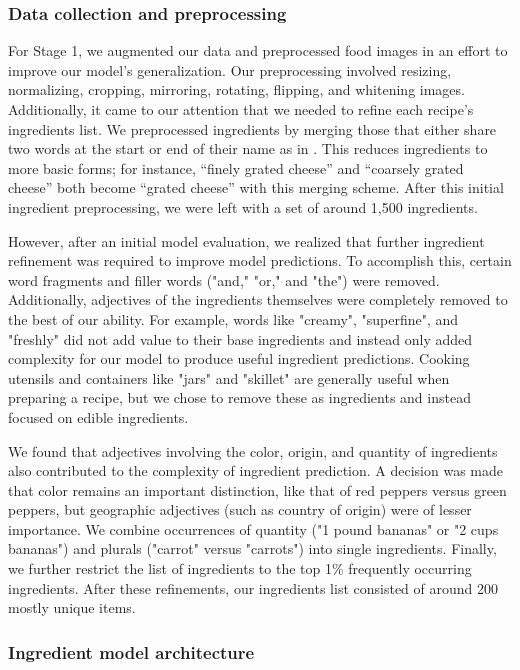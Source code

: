 \documentclass[10pt,twocolumn,letterpaper]{article}
\begin{document}
\subsubsection{Data collection and preprocessing}
For Stage 1, we augmented our data and preprocessed food images in an effort to improve our model's generalization. Our preprocessing involved resizing, normalizing, cropping, mirroring, rotating, flipping, and whitening images. Additionally, it came to our attention that we needed to refine each recipe's ingredients list. We preprocessed ingredients by merging those that either share two words at the start or end of their name as in \cite{Salvador_Drozdzal_Giro-i-Nieto_Romero_2019_orig_2}. This reduces ingredients to more basic forms; for instance, “finely grated cheese” and “coarsely grated cheese” both become “grated cheese” with this merging scheme. After this initial ingredient preprocessing, we were left with a set of around 1,500 ingredients.

However, after an initial model evaluation, we realized that further ingredient refinement was required to improve model predictions. To accomplish this, certain word fragments and filler words (\eg "and," "or," and "the") were removed. Additionally, adjectives of the ingredients themselves were completely removed to the best of our ability. For example, words like "creamy", "superfine", and "freshly" did not add value to their base ingredients and instead only added complexity for our model to produce useful ingredient predictions. Cooking utensils and containers like "jars" and "skillet" are generally useful when preparing a recipe, but we chose to remove these as ingredients and instead focused on edible ingredients.

We found that adjectives involving the color, origin, and quantity of ingredients also contributed to the complexity of ingredient prediction. A decision was made that color remains an important distinction, like that of red peppers versus green peppers, but geographic adjectives (such as country of origin) were of lesser importance. We combine occurrences of quantity (\eg "1 pound bananas" or "2 cups bananas") and plurals (\eg "carrot" versus "carrots") into single ingredients. Finally, we further restrict the list of ingredients to the top 1\% frequently occurring ingredients. After these refinements, our ingredients list consisted of around 200 mostly unique items.

\subsubsection{Ingredient model architecture}
\end{document}
